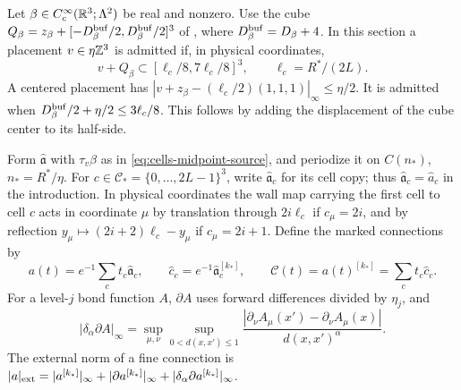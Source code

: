 Let $\beta\in C_c^\infty(\mathbb R^3;\Lambda^2)$ be real
and nonzero. Use the cube
$Q_\beta=z_\beta+[-D_\beta^{\rm buf}/2,D_\beta^{\rm buf}/2]^3$
of ,
where $D_\beta^{\rm buf}=D_\beta+4$.
In this section a placement $v\in\eta\mathbb Z^3$
is admitted if, in physical coordinates,
\begin{equation}\label{eq:interacting-admitted-placement}
              v+Q_\beta\subset[\ell_c/8,7\ell_c/8]^3,
              \qquad \ell_c=R^*/(2L).
\end{equation}
A centered placement has
$|v+z_\beta-(\ell_c/2)(1,1,1)|_\infty\le\eta/2$.
It is admitted when
$D_\beta^{\rm buf}/2+\eta/2\le3\ell_c/8$.
This follows by adding the displacement
of the cube center to its half-side.

Form $\widehat{\mathfrak a}$ with $\tau_v\beta$
as in \eqref{eq:cells-midpoint-source}, and
periodize it on $C(n_*)$, $n_*=R^*/\eta$.
For $c\in\mathcal C_*=\{0,\ldots,2L-1\}^3$,
write $\widehat{\mathfrak a}_c$ for its
cell copy; thus $\widehat{\mathfrak a}_c=\widehat a_c$ in the
introduction. In physical coordinates the
wall map carrying the first cell to cell $c$
acts in coordinate $\mu$ by translation through
$2i\ell_c$ if $c_\mu=2i$, and by reflection
$y_\mu\mapsto(2i+2)\ell_c-y_\mu$ if $c_\mu=2i+1$.
Define the marked connections by
\begin{equation}\label{eq:interacting-marked-connections}
 a(t)=e^{-1}\sum_ct_c\widehat{\mathfrak a}_c,\qquad
 \widehat c_c=e^{-1}\widehat{\mathfrak a}_c^{[k_*]},\qquad
 \mathscr C(t)=a(t)^{[k_*]}=\sum_ct_c\widehat c_c .
\end{equation}
For a level-$j$ bond function $A$, $\partial A$
uses forward differences divided by $\eta_j$,
and
\[
 |\delta_\alpha\partial A|_\infty
  =\sup_{\mu,\nu}\sup_{0<d(x,x')\le1}
     \frac{|\partial_\nu A_\mu(x')-\partial_\nu A_\mu(x)|}
          {d(x,x')^\alpha}.
\]
The external norm of a fine connection is
$|a|_{\rm ext}=|a^{[k_*]}|_\infty+
|\partial a^{[k_*]}|_\infty+
|\delta_\alpha\partial a^{[k_*]}|_\infty$.

